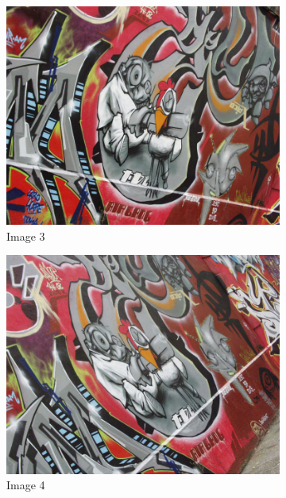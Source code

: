 \documentclass[12pt]{article}
\begin{document}
\begin{figure}[H]
\begin{subfigure}{0.45\textwidth}
        \includegraphics[height=0.75\textwidth]{images/img3.png}
        \caption{Image 3}
        \label{graffiti-3}
    \end{subfigure}
    \begin{subfigure}{0.45\textwidth}
        \centering
        \includegraphics[height=0.75\textwidth]{images/img4.png}
        \caption{Image 4}
        \label{graffiti-4}
    \end{subfigure}
    \begin{subfigure}{0.45\textwidth}
        \centering

\end{subfigure}
\end{figure}
\end{document}
